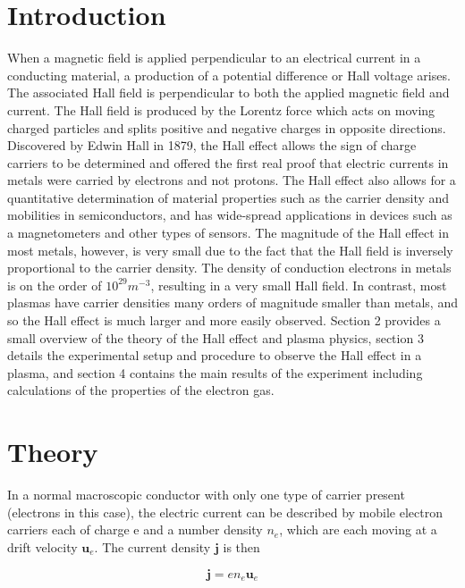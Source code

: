 \documentclass[%
 aip,
rsi,%
 amsmath,amssymb,
 reprint,%
author-numerical,%
]{revtex4-1}
\begin{document}
\section{Introduction}
When a magnetic field is applied perpendicular to an electrical current in a conducting material, a production of a potential difference or Hall voltage arises. The associated Hall field is perpendicular to both the applied magnetic field and current. The Hall field is produced by the Lorentz force which acts on moving charged particles and splits positive and negative charges in opposite directions.\newline
\indent Discovered by Edwin Hall in 1879, the Hall effect allows the sign of charge carriers to be determined and offered the first real proof that electric currents in metals were carried by electrons and not protons. The Hall effect also allows for a quantitative determination of material properties such as the carrier density and mobilities in semiconductors, and has wide-spread applications in devices such as a magnetometers and other types of sensors. \newline
\indent The magnitude of the Hall effect in most metals, however, is very small due to the fact that the Hall field is inversely proportional to the carrier density. The density of conduction electrons in metals is on the order of $10^{29} m^{-3}$, resulting in a very small Hall field. In contrast, most plasmas have carrier densities many orders of magnitude smaller than metals\cite{Kunkel}, and so the Hall effect is much larger and more easily observed. \newline
\indent Section 2 provides a small overview of the theory of the Hall effect and plasma physics, section 3 details the experimental setup and procedure to observe the Hall effect in a plasma, and section 4 contains the main results of the experiment including calculations of the properties of the electron gas.

\section{Theory}
In a normal macroscopic conductor with only one type of carrier present (electrons in this case), the electric current can be described by mobile electron carriers each of charge e and a number density $n_{e}$, which are each moving at a drift velocity $\boldsymbol { u } _ { e }$. The current density $\boldsymbol{j}$ is then

\begin{equation}
\boldsymbol{j} = e n _ { e } \boldsymbol { u } _ { e }
\label{eq:one}
\end{equation}
\end{document}
